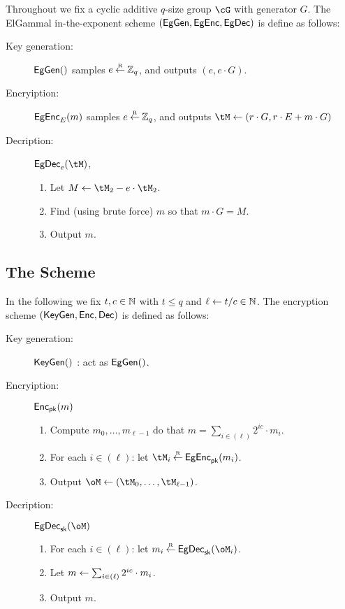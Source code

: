 Throughout we fix a cyclic  additive $q$-size group $\cG$ with generator $G$. The  ElGammal in-the-exponent scheme $(\mathsf{EgGen},\mathsf{EgEnc},\mathsf{EgDec})$ is define as follows:
\begin{description}
	\item[Key generation:] $\mathsf{EgGen}()$ samples $e\mathbin{\stackrel{\mbox{\tiny R}}{\leftarrow}} {\mathbb Z}_q$, and outputs $(e,e\cdot G)$.
	
	\item[Encryiption:] $\mathsf{EgEnc}_E(m)$  samples $e\mathbin{\stackrel{\mbox{\tiny R}}{\leftarrow}} {\mathbb Z}_q$, and outputs  $\tM \asn (r\cdot G, r\cdot E + m \cdot G)$
	
	
		\item[Decription:] $\EgDec_e(\tM)$,   
		\begin{enumerate}
			\item 	Let $M \asn \tM_2 - e\cdot \tM_2$.
			
			\item Find (using brute force) $m$ so that $m\cdot G = M$.
			
			\item Output $m$.
		\end{enumerate}
	\end{description}
	
	
\subsection{The Scheme}\label{sec:ChanksEG:EGScheme}
In the following we fix $t,c\in {\mathbb{N}}$ with $t\le q$ and $\ell \leftarrow t/c \in {\mathbb{N}}$. The encryption scheme $(\mathsf{KeyGen},\mathsf{Enc},\mathsf{Dec})$ is defined as follows:

\begin{description}
	\item[Key generation:] $\mathsf{KeyGen}()$ : act as $\mathsf{EgGen}()$.
	
	\item[Encryiption:] $\mathsf{Enc}_{\mathsf{pk}}(m)$
	
	\begin{enumerate}
		\item Compute $m_0,\ldots,m_{\ell-1}$ do that $m =  \sum_{i \in (\ell)}    2^{i c} \cdot m_i $.
		\item For each $i\in (\ell)$: let $\tM_i \getsr \EgEnc_\pk(m_i)$.
		
		\item Output $\oM \asn (\tM_0,\ldots, \tM_{\ell-1})$.
		
	\end{enumerate}
	 
	\item[Decription:] $\EgDec_\sk(\oM)$   
	\begin{enumerate}
		\item 	 For each $i\in (\ell)$: let $m_i \getsr \EgDec_\sk(\oM_i)$.
		
		\item Let  $m \leftarrow \sum_{i \in (\ell)}   2^{i c} \cdot  m_i $.
		
		\item Output $m$.
	\end{enumerate}
\end{description}



